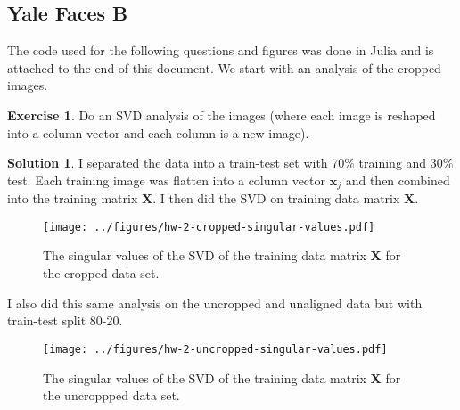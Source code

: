 \documentclass[12pt]{article}
\renewcommand{\vec}[1]{\mathbf{#1}}
\theoremstyle{definition}
\newtheorem{exer}{Exercise}
\newtheorem{sol}{Solution}
\theoremstyle{remark}
\begin{document}
\subsection*{Yale Faces B}%
\label{sub:yale_faces_b}

The code used for the following questions and figures was done in Julia and is attached to the end of this document. We start with an analysis of the cropped images.
\begin{exer}
Do an SVD analysis of the images (where each image is reshaped into a column vector and each column is a new image).
\end{exer}
\begin{sol}
    I separated the data into a train-test set with 70\% training and 30\% test. Each training image was flatten into a column vector $\vec{x}_j$ and then combined into the training matrix $\vec{X}$. I then did the SVD on training data matrix $\vec{X}$.
\begin{figure}[h]
    \centering
    \texttt{[image: ../figures/hw-2-cropped-singular-values.pdf]}
    \caption{The singular values of the SVD of the training data matrix $\vec{X}$ for the cropped data set.}%
    \label{fig:cropped_spectrum}
\end{figure}

I also did this same analysis on the uncropped and unaligned data but with train-test split 80-20. 

\begin{figure}[h]
    \centering
    \texttt{[image: ../figures/hw-2-uncropped-singular-values.pdf]}
    \caption{The singular values of the SVD of the training data matrix $\vec{X}$ for the uncroppped data set.}%
    \label{fig:uncropped_spectrum}
\end{figure}
\end{sol}
\end{document}
